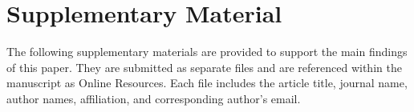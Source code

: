 \documentclass[10pt,twocolumn]{article}
\begin{document}
%
%

\section{Supplementary Material}\label{Sec 8}

\noindent The following supplementary materials are provided to support the main findings of this paper. They are submitted as separate files and are referenced within the manuscript as Online Resources. Each file includes the article title, journal name, author names, affiliation, and corresponding author’s email.


\vspace{1em}
\end{document}
